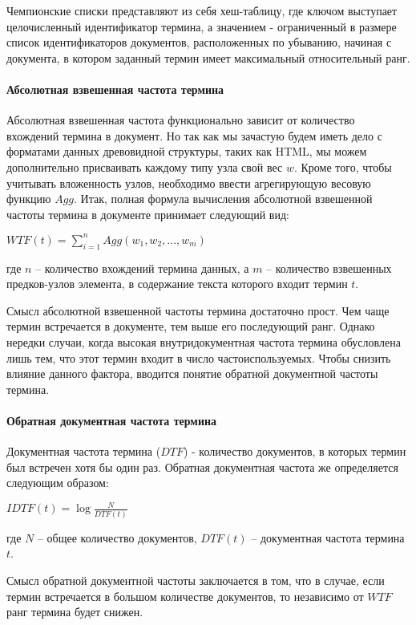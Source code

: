 Чемпионские списки представляют из себя хеш-таблицу, где ключом выступает целочисленный идентификатор термина, а значением - ограниченный в размере список идентификаторов документов, расположенных по убыванию, начиная с документа, в котором заданный термин имеет максимальный относительный ранг. 

\paragraph{Абсолютная взвешенная частота термина}

Абсолютная взвешенная частота функционально зависит от количество вхождений термина в документ. Но так как мы зачастую будем иметь дело с форматами данных древовидной структуры, таких как HTML, мы можем дополнительно присваивать каждому типу узла свой вес $w$. Кроме того, чтобы учитывать вложенность узлов, необходимо ввести агрегирующую весовую функцию $Agg$. Итак, полная формула вычисления абсолютной взвешенной частоты термина в документе принимает следующий вид:

\begin{center}
$WTF(t) = \sum_{i = 1}^{n}Agg(w_1, w_2, ..., w_m)$
\end{center} где $n$ -- количество вхождений термина данных, а $m$ -- количество взвешенных предков-узлов элемента, в содержание текста которого входит термин $t$.

Смысл абсолютной взвешенной частоты термина достаточно прост. Чем чаще термин встречается в документе, тем выше его последующий ранг. Однако нередки случаи, когда высокая внутридокументная частота термина обусловлена лишь тем, что этот термин входит в число частоиспользуемых. Чтобы снизить влияние данного фактора, вводится понятие обратной документной частоты термина.

\paragraph{Обратная документная частота термина}

Документная частота термина ($DTF$) - количество документов, в которых термин был встречен хотя бы один раз. Обратная документная частота же определяется следующим образом:

\begin{center}
$IDTF(t) = \log\frac{N}{DTF(t)}$
\end{center} где $N$ -- общее количество документов, $DTF(t)$ -- документная частота термина $t$.

Смысл обратной документной частоты заключается в том, что в случае, если термин встречается в большом количестве документов, то независимо от $WTF$ ранг термина будет снижен.

